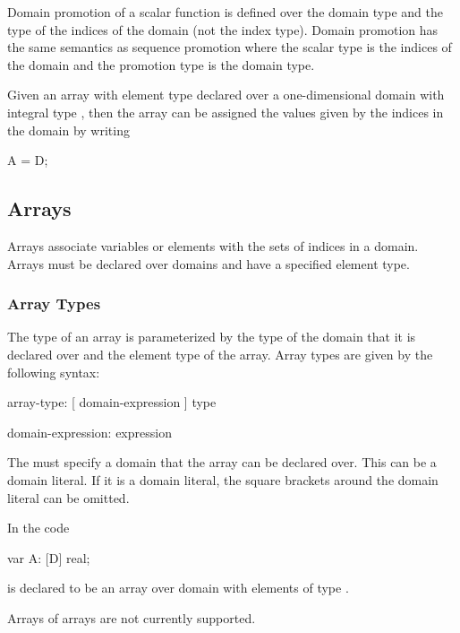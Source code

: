 Domain promotion of a scalar function is defined over the domain type
and the type of the indices of the domain (not the index type).
Domain promotion has the same semantics as sequence promotion where
the scalar type is the indices of the domain and the promotion type is
the domain type.

\begin{example}
Given an array  with element type  declared over a
one-dimensional domain  with integral type , then
the array can be assigned the values given by the indices in the
domain by writing
\begin{chapel}
A = D;
\end{chapel}
\end{example}

\subsection{Arrays}
\label{Arrays}

Arrays associate variables or elements with the sets of indices in a
domain.  Arrays must be declared over domains and have a specified
element type.

\subsubsection{Array Types}
\label{Array_Types}

The type of an array is parameterized by the type of the domain that
it is declared over and the element type of the array.  Array types
are given by the following syntax:
\begin{syntax}
array-type:
  [ domain-expression ] type

domain-expression:
  expression
\end{syntax}
The  must specify a domain that the array can
be declared over.  This can be a domain literal.  If it is a domain
literal, the square brackets around the domain literal can be omitted.

\begin{example}
In the code
\begin{chapel}
var A: [D] real;
\end{chapel}
 is declared to be an array over domain  with
elements of type .
\end{example}

\begin{status}
Arrays of arrays are not currently supported.
\end{status}

